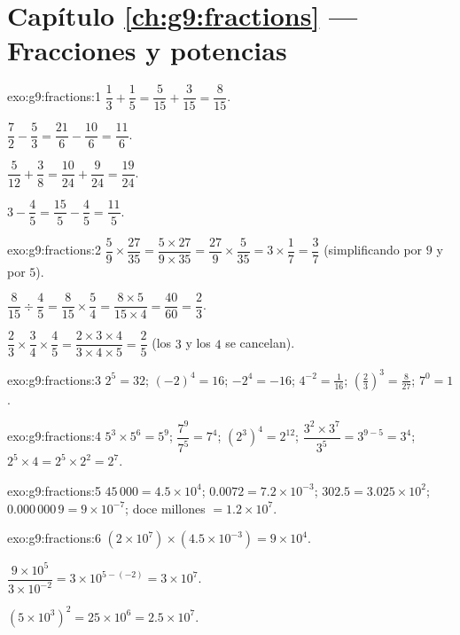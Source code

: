 \section*{Capítulo \ref{ch:g9:fractions} --- Fracciones y potencias}

\begin{solution}{exo:g9:fractions:1}
$\dfrac13 + \dfrac15 = \dfrac{5}{15} + \dfrac{3}{15} = \dfrac{8}{15}$.

$\dfrac72 - \dfrac53 = \dfrac{21}{6} - \dfrac{10}{6} = \dfrac{11}{6}$.

$\dfrac{5}{12} + \dfrac38 = \dfrac{10}{24} + \dfrac{9}{24} =
\dfrac{19}{24}$.

$3 - \dfrac45 = \dfrac{15}{5} - \dfrac45 = \dfrac{11}{5}$.
\end{solution}

\begin{solution}{exo:g9:fractions:2}
$\dfrac59 \times \dfrac{27}{35} = \dfrac{5 \times 27}{9 \times 35}
= \dfrac{27}{9} \times \dfrac{5}{35} = 3 \times \dfrac17 = \dfrac37$
(simplificando por $9$ y por $5$).

$\dfrac{8}{15} \div \dfrac45 = \dfrac{8}{15} \times \dfrac54
= \dfrac{8 \times 5}{15 \times 4} = \dfrac{40}{60} = \dfrac23$.

$\dfrac23 \times \dfrac34 \times \dfrac45 = \dfrac{2 \times 3 \times 4}
{3 \times 4 \times 5} = \dfrac25$ (los $3$ y los $4$ se cancelan).
\end{solution}

\begin{solution}{exo:g9:fractions:3}
$2^5 = 32$; \quad $(-2)^4 = 16$; \quad $-2^4 = -16$; \quad
$4^{-2} = \frac{1}{16}$; \quad
$\left(\frac23\right)^3 = \frac{8}{27}$; \quad $7^0 = 1$.
\end{solution}

\begin{solution}{exo:g9:fractions:4}
$5^3 \times 5^6 = 5^9$; \quad $\dfrac{7^9}{7^5} = 7^4$; \quad
$\left(2^3\right)^4 = 2^{12}$; \quad
$\dfrac{3^2 \times 3^7}{3^5} = 3^{9-5} = 3^4$; \quad
$2^5 \times 4 = 2^5 \times 2^2 = 2^7$.
\end{solution}

\begin{solution}{exo:g9:fractions:5}
$45\,000 = 4.5 \times 10^4$; \quad
$0.0072 = 7.2 \times 10^{-3}$; \quad
$302.5 = 3.025 \times 10^2$; \quad
$0.000\,000\,9 = 9 \times 10^{-7}$; \quad
doce millones $= 1.2 \times 10^7$.
\end{solution}

\begin{solution}{exo:g9:fractions:6}
$(2 \times 10^7) \times (4.5 \times 10^{-3}) = 9 \times 10^{4}$.

$\dfrac{9 \times 10^5}{3 \times 10^{-2}} = 3 \times 10^{5 - (-2)}
= 3 \times 10^7$.

$(5 \times 10^3)^2 = 25 \times 10^6 = 2.5 \times 10^7$.
\end{solution}

